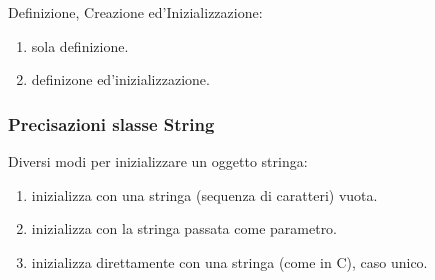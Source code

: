 Definizione, Creazione ed'Inizializzazione:
\begin{enumerate}
	\item {} sola definizione.
	\item {} definizone ed'inizializzazione.
\end{enumerate}


\subsubsection{Precisazioni slasse String}
Diversi modi per inizializzare un oggetto stringa:
\begin{enumerate}
	\item {} inizializza con una stringa (sequenza di caratteri) vuota.
	\item {} inizializza con la stringa passata come parametro.
	\item {} inizializza direttamente con una stringa (come in C), caso unico.
\end{enumerate}